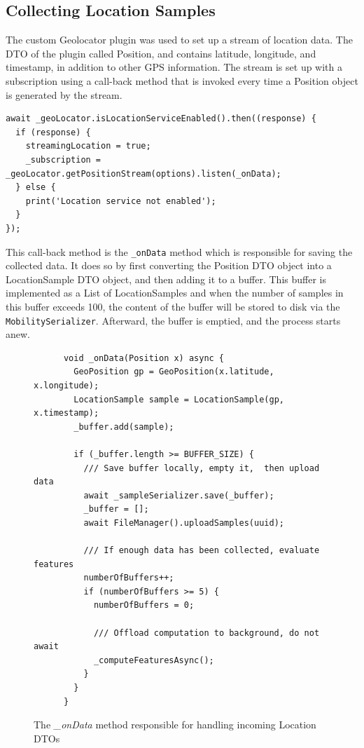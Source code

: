 \subsection{Collecting Location Samples}
The custom Geolocator plugin was used to set up a stream of location data. The DTO of the plugin called Position, and contains latitude, longitude, and timestamp, in addition to other GPS information. The stream is set up with a subscription using a call-back method that is invoked every time a Position object is generated by the stream. 

\begin{verbatim}
await _geoLocator.isLocationServiceEnabled().then((response) {
  if (response) {
    streamingLocation = true;
    _subscription = _geoLocator.getPositionStream(options).listen(_onData);
  } else {
    print('Location service not enabled');
  }
});
\end{verbatim}

This call-back method is the \verb|_onData| method which is responsible for saving the collected data. It does so by first converting the Position DTO object into a LocationSample DTO object, and then adding it to a buffer. This buffer is implemented as a List of LocationSamples and when the number of samples in this buffer exceeds 100, the content of the buffer will be stored to disk via the \verb|MobilitySerializer|. Afterward, the buffer is emptied, and the process starts anew. 

\begin{figure}
    \centering
    \begin{verbatim}
      void _onData(Position x) async {
        GeoPosition gp = GeoPosition(x.latitude, x.longitude);
        LocationSample sample = LocationSample(gp, x.timestamp);
        _buffer.add(sample);

        if (_buffer.length >= BUFFER_SIZE) {
          /// Save buffer locally, empty it,  then upload data
          await _sampleSerializer.save(_buffer);
          _buffer = [];
          await FileManager().uploadSamples(uuid);
    
          /// If enough data has been collected, evaluate features
          numberOfBuffers++;
          if (numberOfBuffers >= 5) {
            numberOfBuffers = 0;
    
            /// Offload computation to background, do not await
            _computeFeaturesAsync();
          }
        }
      }
    \end{verbatim}
    \caption{The \textit{\_onData} method responsible for handling incoming Location DTOs}
    \label{fig:ondata-method}
\end{figure}


